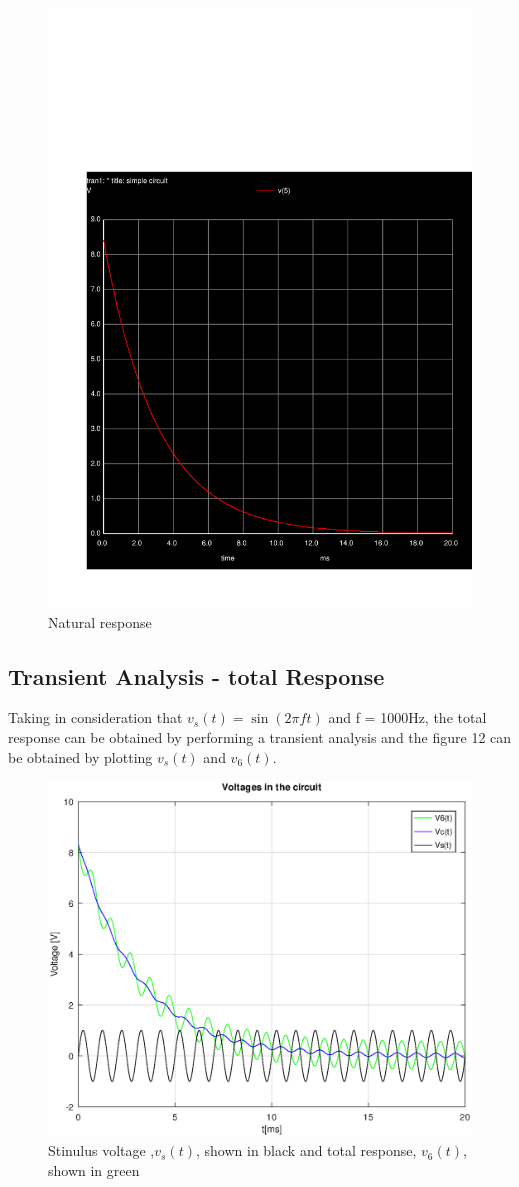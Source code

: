 \begin{figure}[H] \centering
\includegraphics[width=0.6\linewidth]{trans.pdf}
\caption{Natural response}
\label{fig:rc1}
\end{figure}


\subsection{Transient Analysis - total Response}

Taking in consideration that $v_s(t) = \sin(2\pi ft)$ and f = 1000Hz, the total response can be obtained by performing a transient analysis and the figure 12 can be obtained by plotting $v_s(t)$ and $v_6(t)$. 

\begin{figure}[H] \centering
\includegraphics[width=0.6\linewidth]{global_voltage.eps}
\caption{Stinulus voltage ,$v_s(t)$, shown in black and total response, $v_6(t)$, shown in green}
\label{fig:rc1}
\end{figure}


